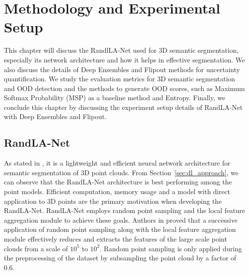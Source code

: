 
\chapter{Methodology and Experimental Setup}
\label{chapter:methodology}
This chapter will discuss the RandlLA-Net used for 3D semantic segmentation, especially its network architecture and how it helps in effective segmentation. 
We also discuss the details of Deep Ensembles and Flipout methods for uncertainty quantification.
We study the evaluation metrics for 3D semantic segmentation and OOD detection and the methods to generate OOD scores, such as Maximum Softmax Probability (MSP) as a baseline method and Entropy.
Finally, we conclude this chapter by discussing the experiment setup details of RandLA-Net with Deep Ensembles and Flipout.
\section{RandLA-Net}
\label{sec:meth_randla}
As stated in \cite{Hu_2020_CVPR_Randla}, it is a lightweight and efficient neural network architecture for semantic segmentation of 3D point clouds.
From Section~\ref{sec:dl_approach}, we can observe that the RandLA-Net architecture is best performing among the point models.
Efficient computation, memory usage and a model with direct application to 3D points are the primary motivation when developing the RandLA-Net.
RandLA-Net employs random point sampling and the local feature aggregation module to achieve these goals.
Authors in \cite{Hu_2020_CVPR_Randla} proved that a successive application of random point sampling along with the local feature aggregation module effectively reduces and extracts the features of the large scale point clouds from a scale of $10^5$ to $10^2$.
Random point sampling is only applied during the preprocessing of the dataset by subsampling the point cloud by a factor of 0.6.

